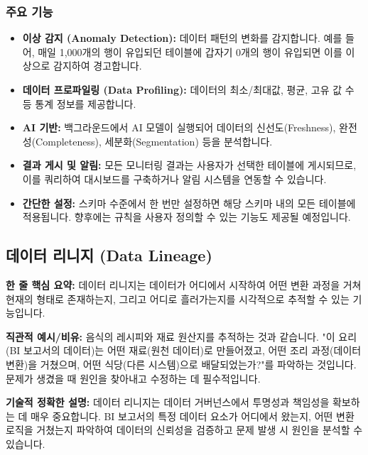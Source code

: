 \documentclass[11pt,a4paper]{article}
\theoremstyle{definition}
\begin{document}
\subsubsection*{주요 기능}
\begin{itemize}
    \item \textbf{이상 감지 (Anomaly Detection):} 데이터 패턴의 변화를 감지합니다. 예를 들어, 매일 1,000개의 행이 유입되던 테이블에 갑자기 0개의 행이 유입되면 이를 이상으로 감지하여 경고합니다.
    \item \textbf{데이터 프로파일링 (Data Profiling):} 데이터의 최소/최대값, 평균, 고유 값 수 등 통계 정보를 제공합니다.
    \item \textbf{AI 기반:} 백그라운드에서 AI 모델이 실행되어 데이터의 신선도(Freshness), 완전성(Completeness), 세분화(Segmentation) 등을 분석합니다.
    \item \textbf{결과 게시 및 알림:} 모든 모니터링 결과는 사용자가 선택한 테이블에 게시되므로, 이를 쿼리하여 대시보드를 구축하거나 알림 시스템을 연동할 수 있습니다.
    \item \textbf{간단한 설정:} 스키마 수준에서 한 번만 설정하면 해당 스키마 내의 모든 테이블에 적용됩니다. 향후에는 규칙을 사용자 정의할 수 있는 기능도 제공될 예정입니다.
\end{itemize}

\newpage
\subsection*{데이터 리니지 (Data Lineage)}

\begin{keyconceptbox}
\textbf{한 줄 핵심 요약:} 데이터 리니지는 데이터가 어디에서 시작하여 어떤 변환 과정을 거쳐 현재의 형태로 존재하는지, 그리고 어디로 흘러가는지를 시각적으로 추적할 수 있는 기능입니다.
\end{keyconceptbox}

\textbf{직관적 예시/비유:}
음식의 레시피와 재료 원산지를 추적하는 것과 같습니다. "이 요리(BI 보고서의 데이터)는 어떤 재료(원천 데이터)로 만들어졌고, 어떤 조리 과정(데이터 변환)을 거쳤으며, 어떤 식당(다른 시스템)으로 배달되었는가?"를 파악하는 것입니다. 문제가 생겼을 때 원인을 찾아내고 수정하는 데 필수적입니다.

\textbf{기술적 정확한 설명:}
데이터 리니지는 데이터 거버넌스에서 투명성과 책임성을 확보하는 데 매우 중요합니다. BI 보고서의 특정 데이터 요소가 어디에서 왔는지, 어떤 변환 로직을 거쳤는지 파악하여 데이터의 신뢰성을 검증하고 문제 발생 시 원인을 분석할 수 있습니다.
\end{document}
